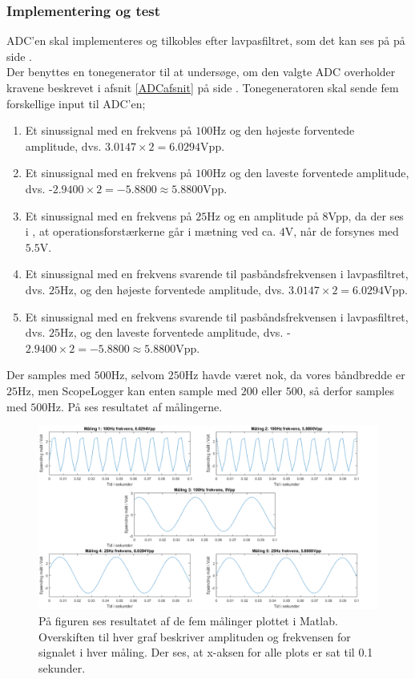 \subsubsection{Implementering og test}
ADC'en skal implementeres og tilkobles efter lavpasfiltret, som det kan ses på  på side \pageref{kravblok}. \\
Der benyttes en tonegenerator til at undersøge, om den valgte ADC overholder kravene beskrevet i afsnit \ref{ADCafsnit} på side \pageref{ADCafsnit}. Tonegeneratoren skal sende fem forskellige input til ADC'en;
\begin{enumerate}
	\item Et sinussignal med en frekvens på $100$Hz og den højeste forventede amplitude, dvs. $3.0147 \times 2 = 6.0294\text{Vpp}$.
	\item Et sinussignal med en frekvens på $100$Hz og den laveste forventede amplitude, dvs. -$2.9400 \times 2 = -5.8800 \approx 5.8800\text{Vpp}$.
	\item Et sinussignal med en frekvens på $25$Hz og en amplitude på $8$Vpp, da der ses i , at operationsforstærkerne går i mætning ved ca. $4$V, når de forsynes med $5.5$V. 
	\item Et sinussignal med en frekvens svarende til pasbåndsfrekvensen i lavpasfiltret, dvs. $25$Hz, og den højeste forventede amplitude, dvs. $3.0147 \times 2 = 6.0294\text{Vpp}$.
	\item Et sinussignal med en frekvens svarende til pasbåndsfrekvensen i lavpasfiltret, dvs. $25$Hz, og den laveste forventede amplitude, dvs. -$2.9400 \times 2 = -5.8800 \approx 5.8800\text{Vpp}$.
\end{enumerate}
Der samples med $500$Hz, selvom $250$Hz havde været nok, da vores båndbredde er $25$Hz, men ScopeLogger kan enten sample med $200$ eller $500$, så derfor samples med $500$Hz. På  ses resultatet af målingerne.

\begin{figure}[H]
	\centering
	\includegraphics[scale=0.45]{figures/cProblemloesning/ADC_Test2_matlab.PNG}
	\caption{På figuren ses resultatet af de fem målinger plottet i Matlab. Overskiften til hver graf beskriver amplituden og frekvensen for signalet i hver måling. Der ses, at x-aksen for alle plots er sat til 0.1 sekunder.}
	\label{fig:ADC_Test}
\end{figure}

